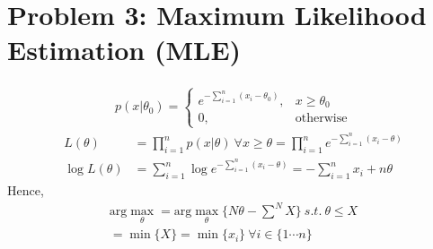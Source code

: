 \section{Problem 3: Maximum Likelihood Estimation (MLE)}

	\begin{align*}
		p(x | \theta_{0}) = \begin{cases}
			e^{- \sum_{i=1}^{n} (x_{i} - \theta_{0})}, & x \geq \theta_{0} \\
			0, & \text{otherwise}
		\end{cases} 
	\end{align*}
	\begin{align*}
		L(\theta) & = \prod_{i=1}^{n} p(x | \theta) \ \forall x \geq \theta = \prod_{i=1}^{n} e^{- \sum_{i=1}^{n} (x_{i} - \theta)} \\
		\log{L(\theta)} & = \sum_{i=1}^{n} \log{e^{- \sum_{i=1}^{n} (x_{i} - \theta)}} = -\sum_{i=1}^{n} x_{i} + n\theta
	\end{align*}
	Hence,
	\begin{align*}
		\text{arg}\max_{\theta} = \text{arg}\max_{\theta} \{ N\theta - \sum^{N}X \} \ s.t. \ \theta \leq X \\
		= \min{\{ X \} } = \boxed{\min \{ x_{i} \} \ \forall i \in \{ 1 \cdots n \}}
	\end{align*}
